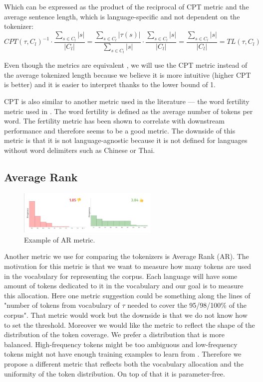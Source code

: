 Which can be expressed as the product of the reciprocal of CPT metric and the average sentence length, which is language-specific and not dependent on the tokenizer:
\begin{equation}
    CPT(\tau, C_l)^{-1} \cdot \frac{\sum_{s \in C_l}|s|}{|C_l|} = \frac{\sum_{s \in C_l}|\tau(s)|}{\sum_{s \in C_l}|s|} \cdot \frac{\sum_{s \in C_l}|s|}{|C_l|} = \frac{\sum_{s \in C_l}|s|}{|C_l|} = TL(\tau, C_l)
\end{equation}

Even though the metrics are equivalent , we will use the CPT metric instead of the average tokenized length because we believe it is more intuitive (higher CPT is better) and it is easier to interpret thanks to the lower bound of 1.

CPT is also similar to another metric used in the literature --- the word fertility metric used in \citet{rust_how_2021}. The word fertility is defined as the average number of tokens per word. The fertility metric has been shown to correlate with downstream performance and therefore seems to be a good metric. The downside of this metric is that it is not language-agnostic because it is not defined for languages without word delimiters such as Chinese or Thai. 

\subsection{Average Rank}

\begin{figure}[h]
    \centering
    \includegraphics[width=0.6\textwidth]{img/temp/ar_example.png}
    \caption{Example of AR metric.}
    \label{fig:ar_example}
\end{figure}

Another metric we use for comparing the tokenizers is Average Rank (AR). The motivation for this metric is that we want to measure how many tokens are used in the vocabulary for representing the corpus. Each language will have some amount of tokens dedicated to it in the vocabulary and our goal is to measure this allocation. Here one metric suggestion could be something along the lines of "number of tokens from vocabulary of $\tau$ needed to cover the 95/98/100\% of the corpus". That metric would work but the downside is that we do not know how to set the threshold. Moreover we would like the metric to reflect the shape of the distribution of the token coverage. We prefer a distribution that is more balanced. High-frequency tokens might be too ambiguous and low-frequency tokens might not have enough training examples to learn from \cite{gowda_finding_2020}. Therefore we propose a different metric that reflects both the vocabulary allocation and the uniformity of the token distribution. On top of that it is parameter-free.

